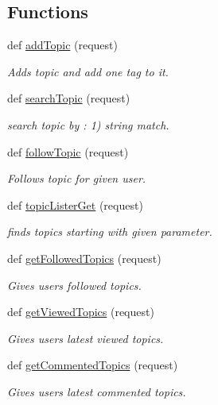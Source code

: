 \subsection*{Functions}
\begin{DoxyCompactItemize}
\item 
def \hyperlink{namespace_meanco_app_1_1views_1_1_api_topic_a049cfbca71b779e10b7142025467e143}{add\+Topic} (request)
\begin{DoxyCompactList}\small\item\em Adds topic and add one tag to it. \end{DoxyCompactList}\item 
def \hyperlink{namespace_meanco_app_1_1views_1_1_api_topic_a7d468b816bae096de9590c7c517eed4c}{search\+Topic} (request)
\begin{DoxyCompactList}\small\item\em search topic by \+: 1) string match. \end{DoxyCompactList}\item 
def \hyperlink{namespace_meanco_app_1_1views_1_1_api_topic_aceb28924ab008fbaa70b78d1b2258d5e}{follow\+Topic} (request)
\begin{DoxyCompactList}\small\item\em Follows topic for given user. \end{DoxyCompactList}\item 
def \hyperlink{namespace_meanco_app_1_1views_1_1_api_topic_ac2330605dba8bd984d16fd10596e1b40}{topic\+Lister\+Get} (request)
\begin{DoxyCompactList}\small\item\em finds topics starting with given parameter. \end{DoxyCompactList}\item 
def \hyperlink{namespace_meanco_app_1_1views_1_1_api_topic_a72ded810f583e39ba21b8bd1b7dbc05e}{get\+Followed\+Topics} (request)
\begin{DoxyCompactList}\small\item\em Gives users followed topics. \end{DoxyCompactList}\item 
def \hyperlink{namespace_meanco_app_1_1views_1_1_api_topic_a467915c3cd43b22d8c3926eb8757e987}{get\+Viewed\+Topics} (request)
\begin{DoxyCompactList}\small\item\em Gives users latest viewed topics. \end{DoxyCompactList}\item 
def \hyperlink{namespace_meanco_app_1_1views_1_1_api_topic_ab2f53fc783135ceb0d4ce3ddeca5989c}{get\+Commented\+Topics} (request)
\begin{DoxyCompactList}\small\item\em Gives users latest commented topics. \end{DoxyCompactList}\end{DoxyCompactItemize}



